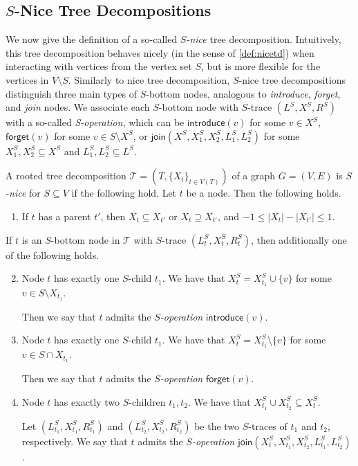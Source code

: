 \documentclass[a4paper,UKenglish,cleveref, autoref, thm-restate, numberwithinsect]{lipics-v2021}
\newcommand{\introduce}{\mathsf{introduce}}
\newcommand{\forget}{\mathsf{forget}}
\newcommand{\join}{\mathsf{join}}
\begin{document}
\subsection{\boldmath$S$-Nice Tree Decompositions}\label{sec:snice}
We now give the definition of a so-called \emph{$S$-nice} tree decomposition. Intuitively, this tree decomposition behaves nicely (in the sense of \cref{def:nicetd}) when interacting with vertices from the vertex set $S$, but is more flexible for the vertices in $V\setminus S$.
Similarly to nice tree decomposition, $S$-nice tree decompositions distinguish three main types of $S$-bottom nodes, analogous to \emph{introduce}, \emph{forget}, and \emph{join} nodes. We associate each $S$-bottom node with $S$-trace $(L^S,X^S,R^S)$ with a so-called \emph{S-operation}, which can be $\introduce(v)$ for some $v\in X^S$, $\forget(v)$ for some $v\in S\setminus X^S$,
or $\join(X^S,X_1^S,X_2^S,L_{1}^S, L_{2}^S)$ for some $X_1^S,X_2^S\subseteq X^S$ and $L_{1}^S,L_{2}^S\subseteq L^S$.
\begin{definition} \label{def:snicetd}
    A rooted tree decomposition $\mathcal{T}=(T,\{X_t\}_{t\in V(T)})$ of a graph $G=(V,E)$ is \emph{$S$-nice} for $S\subseteq V$ if the following hold. Let $t$ be a node.
Then the following holds.
    \begin{enumerate}
        \item If $t$ has a parent $t'$, then $X_t\subseteq X_{t'}$ or $X_t\supseteq X_{t'}$, and $-1\le |X_t|-|X_{t'}|\le 1$.
\end{enumerate}
        If $t$ is an $S$-bottom node in $\mathcal{T}$ with $S$-trace $(L_t^S, X_t^S, R_t^S)$, then additionally one of the following holds.
        \begin{enumerate}\setcounter{enumi}{1}
            \item Node $t$ has exactly one $S$-child $t_1$. 
We have that
$X^S_t= X^S_{t_1}\cup \{v\}$ for some $v\in S\setminus X_{t_1}$. 
            
            Then we say that $t$ admits the \emph{$S$-operation} $\introduce(v)$. 
            \label{condition_S_nice_condition_1_a}
            
            \item Node $t$ has exactly one $S$-child $t_1$.
We have that
$X^S_t=X^S_{t_1}\setminus \{v\}$ for some $v\in S\cap X_{t_1}$. 
            
            Then we say that $t$ admits the \emph{$S$-operation} $\forget(v)$. 
            \label{condition_S_nice_condition_1_b}
            
            \item Node $t$ has exactly two $S$-children $t_1, t_2$.  
We have that $X_{t_1}^S\cup X_{t_2}^S\subseteq X_t^S$.


            Let $(L_{t_1}^S, X_{t_1}^S, R_{t_1}^S)$ and $(L_{t_2}^S, X_{t_2}^S, R_{t_2}^S)$ be the two $S$-traces of $t_1$ and $t_2$, respectively.
            We say that $t$ admits the \emph{$S$-operation} $\join(X^S_t,X^S_{t_1}, X^S_{t_2},L_{t_1}^S, L_{t_2}^S)$. 
\label{condition_S_nice_condition_1_c}
        \end{enumerate} 
\end{definition}
\end{document}
